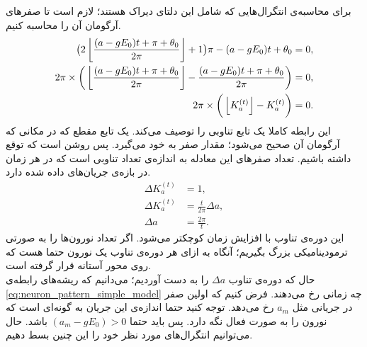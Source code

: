 برای محاسبه‌ی انتگرال‌هایی که شامل این دلتای دیراک هستند؛ لازم است تا صفر‌های آرگومان آن را محاسبه کنیم.
\begin{align}
	\big( 2 \left\lfloor \frac{(a - gE_0)t + \pi + \theta_0}{2\pi} \right\rfloor + 1 \big)\pi - (a - g E_0)t + \theta_0 &= 0 ,\\
	2\pi \times \bigg( \left\lfloor \frac{(a - gE_0)t + \pi + \theta_0}{2\pi} \right\rfloor  - \frac{(a - gE_0)t + \pi + \theta_0}{2\pi} \bigg) &= 0 ,\\
	2\pi \times \bigg( \left\lfloor K^{(t)}_a \right\rfloor - K^{(t)}_a \bigg) &= 0 . \label{eq:neuron_pattern_simple_model}
\end{align}
این رابطه کاملا یک تابع تناوبی را توصیف می‌کند. یک تابع مقطع که در مکانی که آرگومان آن صحیح می‌شود؛ مقدار صفر به خود می‌گیرد. پس روشن است که توقع داشته باشیم. تعداد صفرهای این معادله به اندازه‌ی تعداد تناوبی است که در هر زمان در بازه‌ی جریان‌های داده شده دارد.
\begin{align}
	\Delta K^{(t)}_a  &= 1 ,\\
	\Delta K^{(t)}_a &= \frac{t}{2\pi}\Delta a ,\\
	\Delta a &= \frac{2\pi}{t} .
\end{align}
این دوره‌ی تناوب با افزایش زمان کوچکتر می‌شود. اگر تعداد نورون‌ها را به صورتی ترمودینامیکی بزرگ بگیریم؛ آنگاه به ازای هر دوره‌ی تناوب یک نورون حتما هست که روی محور آستانه قرار گرفته است.\\
حال که دوره‌ی تناوب 
$\Delta a$
را به دست آوردیم؛ می‌دانیم که ریشه‌های رابطه‌ی 
\ref{eq:neuron_pattern_simple_model}
چه زمانی رخ می‌دهند. فرض کنیم که اولین صفر در جریانی مثل
$a_m$
رخ می‌دهد. توجه کنید حتما اندازه‌ی این جریان به گونه‌ای است که نورون را به صورت فعال نگه دارد. پس باید حتما
$(a_m - g E_0) > 0 $
باشد.
حال می‌توانیم انتگرال‌های مورد نظر خود را این چنین بسط دهیم.

